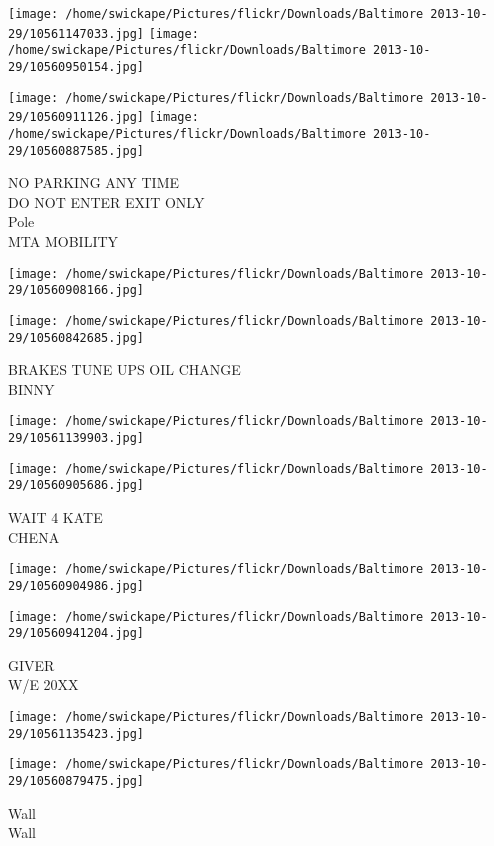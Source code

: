 \documentclass[10pt,letterpaper]{article}
\begin{document}
\texttt{[image: /home/swickape/Pictures/flickr/Downloads/Baltimore 2013-10-29/10561147033.jpg]}
\texttt{[image: /home/swickape/Pictures/flickr/Downloads/Baltimore 2013-10-29/10560950154.jpg]}

\texttt{[image: /home/swickape/Pictures/flickr/Downloads/Baltimore 2013-10-29/10560911126.jpg]}
\texttt{[image: /home/swickape/Pictures/flickr/Downloads/Baltimore 2013-10-29/10560887585.jpg]}

NO PARKING ANY TIME\\
DO NOT ENTER EXIT ONLY\\
Pole\\
MTA MOBILITY
\pagebreak

\texttt{[image: /home/swickape/Pictures/flickr/Downloads/Baltimore 2013-10-29/10560908166.jpg]}

\vspace{0.25in}
\texttt{[image: /home/swickape/Pictures/flickr/Downloads/Baltimore 2013-10-29/10560842685.jpg]}

BRAKES TUNE UPS OIL CHANGE\\
BINNY
\pagebreak

\texttt{[image: /home/swickape/Pictures/flickr/Downloads/Baltimore 2013-10-29/10561139903.jpg]}

\vspace{0.25in}
\texttt{[image: /home/swickape/Pictures/flickr/Downloads/Baltimore 2013-10-29/10560905686.jpg]}

WAIT 4 KATE\\
CHENA
\pagebreak

\texttt{[image: /home/swickape/Pictures/flickr/Downloads/Baltimore 2013-10-29/10560904986.jpg]}

\vspace{0.25in}
\texttt{[image: /home/swickape/Pictures/flickr/Downloads/Baltimore 2013-10-29/10560941204.jpg]}

GIVER\\
W/E 20XX
\pagebreak

\texttt{[image: /home/swickape/Pictures/flickr/Downloads/Baltimore 2013-10-29/10561135423.jpg]}

\vspace{0.25in}
\texttt{[image: /home/swickape/Pictures/flickr/Downloads/Baltimore 2013-10-29/10560879475.jpg]}

Wall\\
Wall
\pagebreak
\end{document}
